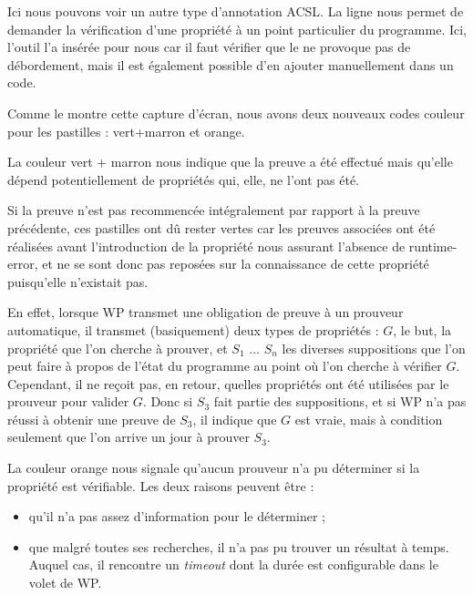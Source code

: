 Ici nous pouvons voir un autre type d'annotation ACSL. La 
ligne  nous permet de demander la vérification 
d'une propriété à un point particulier du programme. Ici, l'outil l'a 
insérée pour nous car il faut vérifier que le  ne provoque pas de 
débordement, mais il est également possible d'en ajouter manuellement dans 
un code.



Comme le montre cette capture d'écran, nous avons deux nouveaux codes couleur
pour les pastilles : vert+marron et orange.



La couleur vert + marron nous indique que la preuve a été effectué mais 
qu'elle dépend potentiellement de propriétés qui, elle, ne l'ont pas été.



Si  la preuve n'est pas recommencée intégralement par rapport à la preuve 
précédente, ces pastilles ont dû rester vertes car les preuves associées ont
été réalisées avant l'introduction de la propriété nous assurant l'absence 
de runtime-error, et ne se sont donc pas reposées sur la connaissance de cette
propriété puisqu'elle n'existait pas.



En effet, lorsque WP transmet une obligation de preuve à un prouveur automatique,
il transmet (basiquement) deux types de propriétés : $G$, le but, la propriété 
que l'on cherche à prouver, et $S_1$ ... $S_n$ les diverses suppositions que l'on
peut faire à propos de l'état du programme au point où l'on cherche à vérifier $G$.
Cependant, il ne reçoit pas, en retour, quelles propriétés ont été utilisées par
le prouveur pour valider $G$. Donc si $S_3$ fait partie des suppositions, et si
WP n'a pas réussi à obtenir une preuve de $S_3$, il indique que $G$ est vraie, mais
à condition seulement que l'on arrive un jour à prouver $S_3$.



La couleur orange nous signale qu'aucun prouveur n'a pu déterminer si la 
propriété est vérifiable. Les deux raisons peuvent être :



\begin{itemize}
\item qu'il n'a pas assez d'information pour le déterminer ;
\item que malgré toutes ses recherches, il n'a pas pu trouver un résultat à 
temps. Auquel cas, il rencontre un \textit{timeout} dont la durée est configurable 
dans le volet de WP.
\end{itemize}


